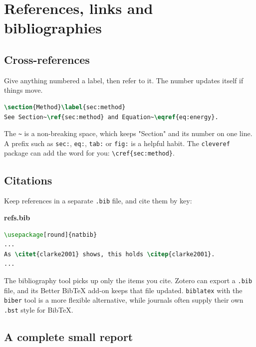 \chapter{References, links and bibliographies}
\label{ch:references}

\section{Cross-references}\label{cross-references}

Give anything numbered a label, then refer to it. The number updates itself if things move.

\begin{lstlisting}[language=latex]
\section{Method}\label{sec:method}
See Section~\ref{sec:method} and Equation~\eqref{eq:energy}.
\end{lstlisting}

The \texttt{\textasciitilde{}} is a non-breaking space, which keeps "Section" and its number on one line. A prefix such as \texttt{sec:}, \texttt{eq:}, \texttt{tab:} or \texttt{fig:} is a helpful habit. The \texttt{cleveref} package can add the word for you: \texttt{\textbackslash{}cref\{sec:method\}}.

\section{Citations}\label{citations}

Keep references in a separate \texttt{.bib} file, and cite them by key:

\textbf{refs.bib}



\begin{lstlisting}[language=latex]
\usepackage[round]{natbib}
...
As \citet{clarke2001} shows, this holds \citep{clarke2001}.
...


\end{lstlisting}

The bibliography tool picks up only the items you cite. Zotero can export a \texttt{.bib} file, and its Better BibTeX add-on keeps that file updated. \texttt{biblatex} with the \texttt{biber} tool is a more flexible alternative, while journals often supply their own \texttt{.bst} style for BibTeX.

\section{A complete small report}\label{a-complete-small-report}

